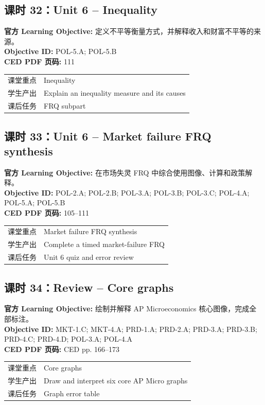 \documentclass[11pt,a4paper]{ctexart}
\newcommand{\objectivebox}[1]{\noindent\colorbox{aplight}{\parbox{0.96\textwidth}{#1}}}
\begin{document}
\subsection{课时 32：Unit 6 -- Inequality}
\objectivebox{\textbf{官方 Learning Objective:} 定义不平等衡量方式，并解释收入和财富不平等的来源。\\\textbf{Objective ID:} POL-5.A; POL-5.B\\\textbf{CED PDF 页码:} 111}\par\vspace{0.4em}
\begin{tabularx}{\textwidth}{p{3.0cm}Y}
\toprule
课堂重点 & Inequality\\
学生产出 & Explain an inequality measure and its causes\\
课后任务 & FRQ subpart\\
\bottomrule
\end{tabularx}
\subsection{课时 33：Unit 6 -- Market failure FRQ synthesis}
\objectivebox{\textbf{官方 Learning Objective:} 在市场失灵 FRQ 中综合使用图像、计算和政策解释。\\\textbf{Objective ID:} POL-2.A; POL-2.B; POL-3.A; POL-3.B; POL-3.C; POL-4.A; POL-5.A; POL-5.B\\\textbf{CED PDF 页码:} 105–111}\par\vspace{0.4em}
\begin{tabularx}{\textwidth}{p{3.0cm}Y}
\toprule
课堂重点 & Market failure FRQ synthesis\\
学生产出 & Complete a timed market-failure FRQ\\
课后任务 & Unit 6 quiz and error review\\
\bottomrule
\end{tabularx}
\subsection{课时 34：Review -- Core graphs}
\objectivebox{\textbf{官方 Learning Objective:} 绘制并解释 AP Microeconomics 核心图像，完成全部标注。\\\textbf{Objective ID:} MKT-1.C; MKT-4.A; PRD-1.A; PRD-2.A; PRD-3.A; PRD-3.B; PRD-4.C; PRD-4.D; POL-3.A; POL-4.A\\\textbf{CED PDF 页码:} CED pp. 166–173}\par\vspace{0.4em}
\begin{tabularx}{\textwidth}{p{3.0cm}Y}
\toprule
课堂重点 & Core graphs\\
学生产出 & Draw and interpret six core AP Micro graphs\\
课后任务 & Graph error table\\
\bottomrule
\end{tabularx}
\end{document}
